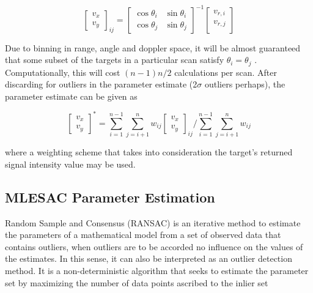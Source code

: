 \documentclass[]{article}
\begin{document}
\begin{equation}
	\begin{bmatrix} v_x \\ v_y  \end{bmatrix}_{ij} = 
	\begin{bmatrix} \cos \theta_i & \sin \theta_i \\ \cos \theta_j & \sin \theta_j \end{bmatrix}^{-1}
	\begin{bmatrix} v_{r,i}\\ v_{r,j}\\  \end{bmatrix}	
\end{equation}

Due to binning in range, angle and doppler space, it will be almost guaranteed that some subset of the targets in a particular scan satisfy $\theta_i = \theta_j$ . Computationally, this will cost $(n-1)n/2$ calculations per scan. After discarding for outliers in the parameter estimate (2$\sigma$ outliers perhaps), the parameter estimate can be given as

\begin{equation}
	\begin{bmatrix} v_x \\ v_y \end{bmatrix}^* = \sum_{i=1}^{n-1} \sum_{j=i+1}^n w_{ij} \begin{bmatrix} v_x \\ v_y  \end{bmatrix}_{ij} \bigg/\sum_{i=1}^{n-1} \sum_{j=i+1}^n w_{ij}
\end{equation}

where a weighting scheme that takes into consideration the target's returned signal intensity value may be used.
	

\subsection{MLESAC Parameter Estimation}

Random Sample and Consensus (RANSAC) is an iterative method to estimate the parameters of a mathematical model from a set of observed data that contains outliers, when outliers are to be accorded no influence on the values of the estimates. In this sense, it can also be interpreted as an outlier detection method. It is a non-deterministic algorithm that seeks to estimate the parameter set by maximizing the number of data points ascribed to the inlier set
\end{document}
